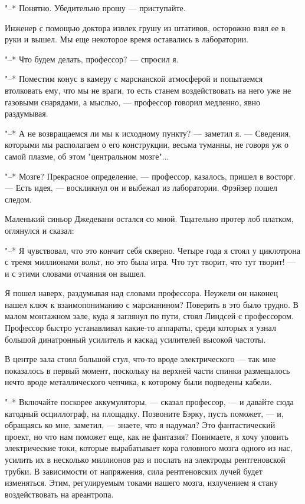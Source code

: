 "--* Понятно. Убедительно прошу --- приступайте.

Инженер с помощью доктора извлек грушу из штативов, осторожно взял ее в
руки и вышел. Мы еще некоторое время оставались в лаборатории.

"--* Что будем делать, профессор? --- спросил я.

"--* Поместим  конус  в  камеру  с  марсианской  атмосферой  и  попытаемся
втолковать ему, что мы не враги, то есть станем воздействовать на него уже
не газовыми снарядами,  а  мыслью,  ---  профессор  говорил  медленно,  явно
раздумывая.

"--* А не возвращаемся ли мы к исходному пункту? --- заметил я. ---  Сведения,
которыми мы располагаем о его конструкции, весьма туманны, не говоря уж  о
самой плазме, об этом "центральном мозге"...

"--* Мозге?  Прекрасное  определение,  ---  профессор,  казалось,  пришел  в
восторг. --- Есть идея, --- воскликнул он и выбежал  из  лаборатории.  Фрэйзер
пошел следом.

Маленький синьор  Джедевани  остался  со  мной.  Тщательно  протер  лоб
платком, оглянулся и сказал:

"--* Я чувствовал, что это кончит себя скверно.  Четыре  года  я  стоял  у
циклотрона с тремя миллионами вольт, но это была игра. Что тут творит, что
тут творит! --- и с этими словами отчаяния он вышел.

Я пошел наверх, раздумывая над словами профессора. Неужели  он  наконец
нашел ключ к взаимопониманию с марсианином? Поверить в это было трудно.  В
малом  монтажном  зале,  куда  я  заглянул  по  пути,  стоял   Линдсей   с
профессором.  Профессор  быстро  устанавливал  какие-то  аппараты,   среди
которых я узнал большой динатронный усилитель и каскад усилителей  высокой
частоты.

В центре зала стоял большой стул, что-то вроде электрического --- так мне
показалось в первый момент, поскольку на верхней части спинки  размещалось
нечто вроде металлического чепчика, к которому были подведены кабели.

"--* Включайте поскорее аккумуляторы, --- сказал профессор, --- и давайте сюда
катодный осциллограф, на площадку. Позвоните Бэрку, пусть  поможет,  ---  и,
обращаясь ко мне, заметил, --- знаете, что  я  надумал?  Это  фантастический
проект, но что нам поможет еще, как не фантазия? Понимаете, я хочу уловить
электрические токи, которые вырабатывает кора головного  мозга  одного  из
нас,  усилить  их  в  несколько  миллионов  раз  и  послать  на  электроды
рентгеновской трубки. В  зависимости  от  напряжения,  сила  рентгеновских
лучей будет изменяться. Этим, регулируемым токами нашего мозга, излучением
я стану воздействовать на ареантропа.

